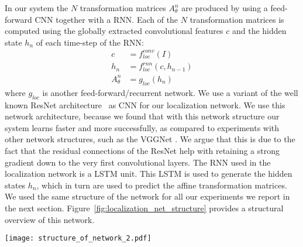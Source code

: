 \documentclass[letterpaper]{article}
\begin{document}
		In our system the $N$ transformation matrices $A^{n}_{\theta}$ are produced by using a feed-forward \ac{CNN} together with a \ac{RNN}. Each of the $N$ transformation matrices is computed using the globally extracted convolutional features $c$ and the hidden state $h_n$ of each time-step of the \ac{RNN}:
		\begin{align}
			c &= f^{conv}_{loc}(I) \\
			h_n &= f^{rnn}_{loc}(c, h_{n-1}) \\
			A^{n}_{\theta} &= g_{loc}(h_n)
		\end{align}
		where $g_{loc}$ is another feed-forward/recurrent network.
		We use a variant of the well known ResNet architecture~\cite{He2016Deep} as \ac{CNN} for our localization network.
		We use this network architecture, because we found that with this network structure our system learns faster and more successfully, as compared to experiments with other network structures, such as the VGGNet \cite{Simonyan2015Very}.
		We argue that this is due to the fact that the residual connections of the ResNet help with retaining a strong gradient down to the very first convolutional layers.
		The \ac{RNN} used in the localization network is a \ac{LSTM} \cite{Hochreiter1997Long} unit.
		This \ac{LSTM} is used to generate the hidden states $h_n$, which in turn are used to predict the affine transformation matrices.
		We used the same structure of the network for all our experiments we report in the next section.
		Figure~\ref{fig:localization_net_structure} provides a structural overview of this network.

	\begin{figure*}[t]
		\centering
		\texttt{[image: structure\_of\_network\_2.pdf]}
		\caption{The network used in our work consists of two major parts. The first is the localization network that takes the input image and predicts $N$ transformation matrices, which are used to create $N$ different sampling grids. The generated sampling grids are used in two ways:
		(1) for calculating the bounding boxes of the identified text regions
		(2) for extracting $N$ text regions.
		The recognition network then performs text recognition on these extracted regions.
		The whole system is trained end-to-end by only supplying information about the text labels for each text region.}
		\label{fig:localization_net_structure}
	\end{figure*}
\end{document}
